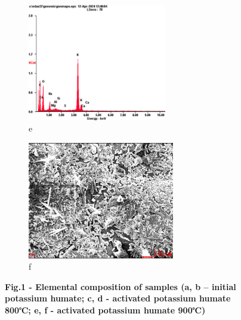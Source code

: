 \begin{figure}[H]
    \begin{subfigure}[t]{0.45\textwidth}
        \centering
        \includegraphics[height=5.1cm]{media/chem2/image91}
        \caption*{e}
    \end{subfigure}
    \begin{subfigure}[t]{0.45\textwidth}
        \centering
        \includegraphics[height=5.1cm]{media/chem2/image92}
        \caption*{f}
    \end{subfigure}
    \caption*{{\bfseries Fig.1 - Elemental composition of samples (a, b -- initial potassium humate; c, d - activated potassium humate 800℃; e, f - activated potassium humate 900℃)}}
\end{figure}

